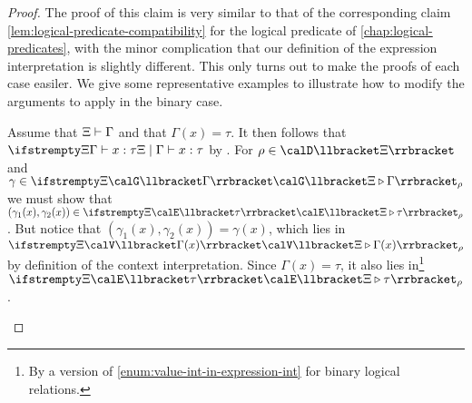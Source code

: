 \begin{proof}
    The proof of this claim is very similar to that of the corresponding claim \cref{lem:logical-predicate-compatibility} for the logical predicate of \cref{chap:logical-predicates}, with the minor complication that our definition of the expression interpretation is slightly different. This only turns out to make the proofs of each case easiler. We give some representative examples to illustrate how to modify the arguments to apply in the binary case.
    \begin{proofsec}
        \item[\ruleref{Rvar}]
        Assume that $\Xi \vdash \Gamma$ and that $\Gamma(x) = \tau$. It then follows that $\typerel{\Xi}{\Gamma}{x}{\tau}$ by . For $\rho \in \tvarInt{\Xi}$ and $\gamma \in \conInt{\Xi}{\Gamma}{\rho}$ we must show that $(\gamma_1(x),\gamma_2(x)) \in \expInt{\Xi}{\tau}{\rho}$. But notice that $(\gamma_1(x),\gamma_2(x)) = \gamma(x)$, which lies in $\valInt{\Xi}{\Gamma(x)}{\rho}$ by definition of the context interpretation. Since $\Gamma(x) = \tau$, it also lies in\footnote{By a version of \cref{enum:value-int-in-expression-int} for binary logical relations.} $\expInt{\Xi}{\tau}{\rho}$.


\end{proofsec}
\end{proof}
